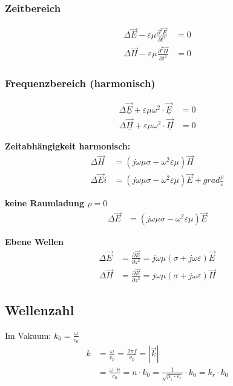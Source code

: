 \subsubsection{Zeitbereich}
\begin{align*}
    \Delta \vec{E}-\varepsilon \mu \frac{\partial^{2} \vec{E}}{\partial t^{2}} & =0 \\
    \Delta \vec{H}-\varepsilon \mu \frac{\partial^{2} \vec{H}}{\partial t^{2}} & =0
\end{align*}

\subsubsection{Frequenzbereich (harmonisch)}
\begin{align*}
    \Delta \underline{\vec{E}}+\varepsilon \mu \omega^{2} \cdot \underline{\vec{E}} & =0 \\
    \Delta \underline{\vec{H}}+\varepsilon \mu \omega^{2} \cdot \underline{\vec{H}} & =0
\end{align*}

\textbf{Zeitabhängigkeit harmonisch:}
\begin{align*}
    \Delta \vec{H}   & = (j \omega \mu \sigma - \omega^2 \varepsilon \mu ) \vec{H}                                  \\
    \Delta \vec{E} i & = (j \omega \mu \sigma - \omega^2 \varepsilon \mu ) \vec{E} + grad \frac{ \rho}{\varepsilon}
\end{align*}

\textbf{keine Raumladung $ \rho = 0$}
\begin{align*}
    \Delta \vec{E} & = (j \omega \mu \sigma - \omega^2 \varepsilon \mu ) \vec{E}
\end{align*}

\textbf{Ebene Wellen}
\begin{align*}
    \Delta \vec{E} & = \frac{ \partial \vec{E}}{ \partial z^2} = j \omega \mu ( \sigma + j \omega \varepsilon) \vec{E} \\
    \Delta \vec{H} & = \frac{ \partial \vec{E}}{ \partial z^2} = j \omega \mu ( \sigma + j \omega \varepsilon) \vec{H}
\end{align*}


\subsection{Wellenzahl}
Im Vakuum: $k_{0}=\frac{\omega}{c_{0}}$
\begin{align*}
    k & = \frac{\omega}{v_p} = \frac{2 \pi f}{v_p} = |\vec{k}|                                                                      \\
      & = \frac{\omega \cdot n}{c_{0}} = n \cdot k_{0}=\frac{1}{\sqrt{\mu_{r} \cdot \varepsilon_{r}}} \cdot k_{0}=k_{r} \cdot k_{0}
\end{align*}

